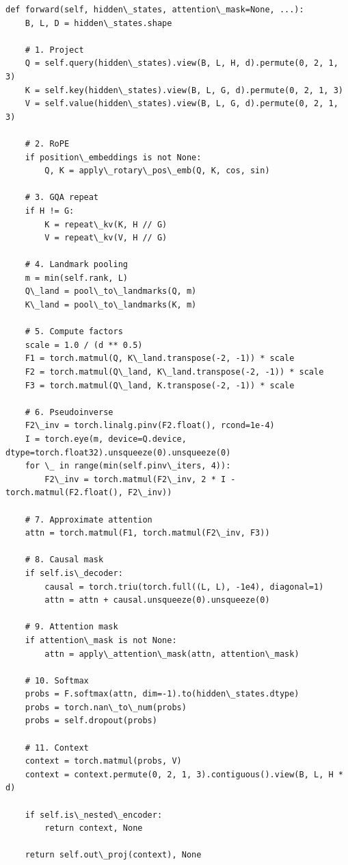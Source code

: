 \begin{lstlisting}
def forward(self, hidden\_states, attention\_mask=None, ...):
    B, L, D = hidden\_states.shape
    
    # 1. Project
    Q = self.query(hidden\_states).view(B, L, H, d).permute(0, 2, 1, 3)
    K = self.key(hidden\_states).view(B, L, G, d).permute(0, 2, 1, 3)
    V = self.value(hidden\_states).view(B, L, G, d).permute(0, 2, 1, 3)
    
    # 2. RoPE
    if position\_embeddings is not None:
        Q, K = apply\_rotary\_pos\_emb(Q, K, cos, sin)
    
    # 3. GQA repeat
    if H != G:
        K = repeat\_kv(K, H // G)
        V = repeat\_kv(V, H // G)
    
    # 4. Landmark pooling
    m = min(self.rank, L)
    Q\_land = pool\_to\_landmarks(Q, m)
    K\_land = pool\_to\_landmarks(K, m)
    
    # 5. Compute factors
    scale = 1.0 / (d ** 0.5)
    F1 = torch.matmul(Q, K\_land.transpose(-2, -1)) * scale
    F2 = torch.matmul(Q\_land, K\_land.transpose(-2, -1)) * scale
    F3 = torch.matmul(Q\_land, K.transpose(-2, -1)) * scale
    
    # 6. Pseudoinverse
    F2\_inv = torch.linalg.pinv(F2.float(), rcond=1e-4)
    I = torch.eye(m, device=Q.device, dtype=torch.float32).unsqueeze(0).unsqueeze(0)
    for \_ in range(min(self.pinv\_iters, 4)):
        F2\_inv = torch.matmul(F2\_inv, 2 * I - torch.matmul(F2.float(), F2\_inv))
    
    # 7. Approximate attention
    attn = torch.matmul(F1, torch.matmul(F2\_inv, F3))
    
    # 8. Causal mask
    if self.is\_decoder:
        causal = torch.triu(torch.full((L, L), -1e4), diagonal=1)
        attn = attn + causal.unsqueeze(0).unsqueeze(0)
    
    # 9. Attention mask
    if attention\_mask is not None:
        attn = apply\_attention\_mask(attn, attention\_mask)
    
    # 10. Softmax
    probs = F.softmax(attn, dim=-1).to(hidden\_states.dtype)
    probs = torch.nan\_to\_num(probs)
    probs = self.dropout(probs)
    
    # 11. Context
    context = torch.matmul(probs, V)
    context = context.permute(0, 2, 1, 3).contiguous().view(B, L, H * d)
    
    if self.is\_nested\_encoder:
        return context, None
    
    return self.out\_proj(context), None
\end{lstlisting}

